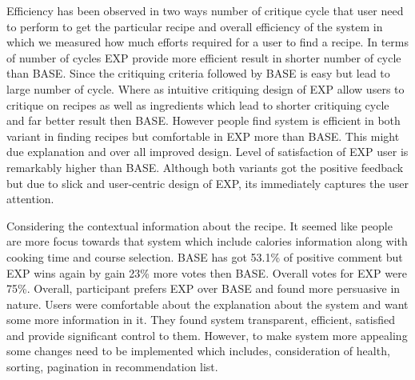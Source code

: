 Efficiency has been observed in two ways number of critique cycle that user need to perform to get the particular recipe and overall efficiency of the system in which we measured how much efforts required for a user to find a recipe. In terms of number of cycles EXP provide more efficient result in shorter number of cycle than BASE. Since the critiquing criteria followed by BASE is easy but lead to large number of cycle. Where as intuitive critiquing design of EXP allow users to critique on recipes as well as ingredients which lead to shorter critiquing cycle and far better result then BASE. However people find system is efficient in both variant in finding recipes but comfortable in EXP more than BASE. This might due explanation and over all improved design. \newline
Level of satisfaction of EXP user is remarkably higher than BASE. Although both variants got the positive feedback but due to slick and user-centric design of EXP, its immediately captures the user attention.\newline

Considering the contextual information about the recipe. It seemed like people are more focus towards that system which include calories information along with cooking time and course selection. BASE has got 53.1\% of positive comment but EXP wins again by gain 23\% more votes then BASE. Overall votes for EXP were 75\%.  
Overall, participant prefers EXP over BASE and found more persuasive in nature. Users were comfortable about the explanation about the system and want some more information in it. They found system transparent, efficient, satisfied and provide significant control to them. However, to make system more appealing some changes need to be implemented which includes, consideration of health, sorting, pagination in recommendation list.  